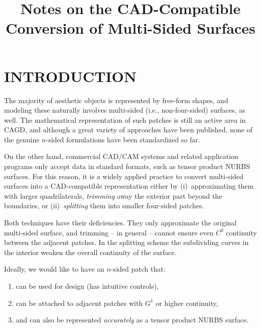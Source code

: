 \documentclass[9pt,academicons]{article}
\title{Notes on the CAD-Compatible Conversion of Multi-Sided Surfaces}
\begin{document}
\maketitle







\section{INTRODUCTION}
\label{sec:intro}
The majority of aesthetic objects is represented by free-form shapes, and modeling these
naturally involves multi-sided (i.e., non-four-sided) surfaces, as well.  The
mathematical representation of such patches is still an active area in CAGD, and although
a great variety of approaches have been published, none of the genuine $n$-sided
formulations have been standardized so far.

On the other hand, commercial CAD/CAM systems and related application programs only accept
data in standard formats, such as tensor product NURBS surfaces. For this reason, it is a
widely applied practice to convert multi-sided surfaces into a CAD-compatible
representation either by (i)~approximating them with larger quadrilaterals,
\emph{trimming} away the exterior part beyond the boundaries, or (ii)~\emph{splitting}
them into smaller four-sided patches.

Both techniques have their deficiencies. They only approximate the original multi-sided
surface, and trimming -- in general -- cannot ensure even $C^0$ continuity between the
adjacent patches. In the splitting scheme the subdividing curves in the interior
weaken the overall continuity of the surface.

Ideally, we would like to have an $n$-sided patch that:
\begin{enumerate}[label=\roman*),leftmargin=3\parindent]
\item can be used for design (has intuitive controls),
\item can be attached to adjacent patches with $G^1$ or higher continuity,
\item and can also be represented \emph{accurately} as a tensor product NURBS surface.
\end{enumerate}
\end{document}
